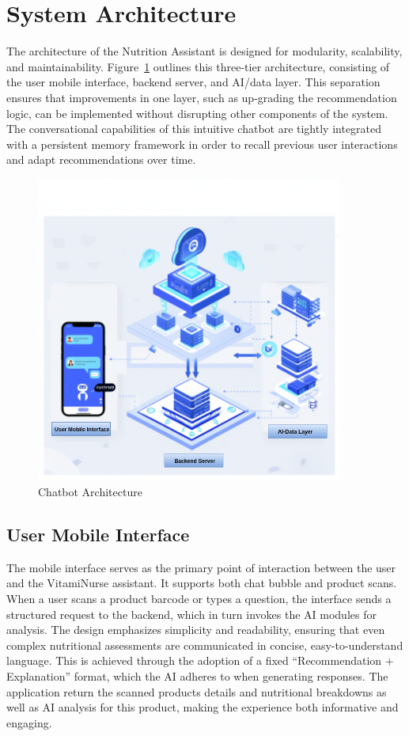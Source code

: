 \section{System Architecture}
The architecture of the Nutrition Assistant is designed for modularity, scalability, and maintainability. Figure~\ref{fig:chatbot Architect} outlines this three-tier architecture, consisting of the user mobile interface, backend server, and AI/data layer.
 This separation ensures that improvements in one layer, such as up-grading the recommendation logic, can be implemented without disrupting other components of the system. The conversational capabilities of this intuitive chatbot are tightly integrated with a persistent memory framework in order to recall previous user interactions and adapt recommendations over time.  
 \begin{center}
    \begin{figure}[H]
    \includegraphics[width=0.9\textwidth]{images/chat_layers.png}
    \caption{Chatbot Architecture} 
    \label{fig:chatbot Architect}
\end{figure}
\end{center}

\subsection{User Mobile Interface}
The mobile interface serves as the primary point of interaction between the user and the VitamiNurse assistant. It supports both chat bubble and product scans. When a user scans a product barcode or types a question, the interface sends a structured request to the backend, which in turn invokes the AI modules for analysis. The design emphasizes simplicity and readability, ensuring that even complex nutritional assessments are communicated in concise, easy-to-understand language. This is achieved through the adoption of a fixed “Recommendation + Explanation” format, which the AI adheres to when generating responses. The application return the scanned products details and nutritional breakdowns as well as AI analysis for this product, making the experience both informative and engaging.

